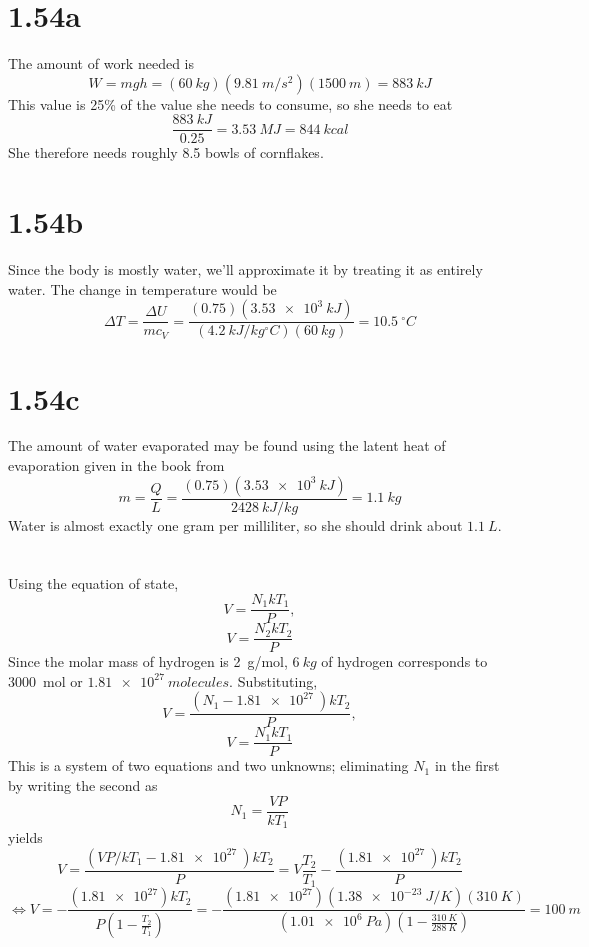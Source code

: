 \documentclass{article}
\begin{document}
\section*{1.54a}
The amount of work needed is
\[W=mgh=(\SI{60}{kg})(\SI{9.81}{m/s^2})(\SI{1500}{m})=\SI{883}{kJ}\]
This value is 25\% of the value she needs to consume, so she needs to eat
\[\frac{\SI{883}{kJ}}{0.25}=\SI{3.53}{MJ}=\SI{844}{kcal}\]
She therefore needs roughly 8.5 bowls of cornflakes.

\section*{1.54b}
Since the body is mostly water, we'll approximate it by treating it as entirely water. The change in temperature would be
\[\Delta T=\frac{\Delta U}{mc_V}=\frac{(0.75)(\SI{3.53e3}{kJ})}{(\SI{4.2}{kJ/kg^\circ C})(\SI{60}{kg})}=\SI{10.5}{^\circ C}\]

\section*{1.54c}
The amount of water evaporated may be found using the latent heat of evaporation given in the book from
\[m=\frac{Q}{L}=\frac{(0.75)(\SI{3.53e3}{kJ})}{\SI{2428}{kJ/kg}}=\SI{1.1}{kg}\]
Water is almost exactly one gram per milliliter, so she should drink about $\SI{1.1}{L}$.

\section{}
Using the equation of state,
\[ V=\frac{N_1k T_1}{P},\]
\[V=\frac{N_2 k T_2}{ P}\]
Since the molar mass of hydrogen is \SI{2}{g/mol}, $\SI{6}{kg}$ of hydrogen corresponds to \SI{3000}{mol} or $\SI{1.81e27}{molecules}$.
Substituting,
\[V=\frac{(N_1-\SI{1.81e27}{})kT_2}{P},\]
\[V=\frac{N_1kT_1}{P}\]
This is a system of two equations and two unknowns; eliminating $N_1$ in the first by writing the second as
\[N_1=\frac{VP}{kT_1}\]
yields
\[V=\frac{(VP/kT_1-\SI{1.81e27}{})kT_2}{P}=V\frac{T_2}{T_1}-\frac{(\SI{1.81e27}{})kT_2}{P}\]
\[\Leftrightarrow V=-\frac{(\SI{1.81e27})kT_2}{P(1-\frac{T_2}{T_1})}=-\frac{(\SI{1.81e27})(\SI{1.38e-23}{J/K})(\SI{310}{K})}{(\SI{1.01e6}{Pa})(1-\frac{\SI{310}{K}}{\SI{288}{K}})}=\SI{100}{m}\]
\end{document}
